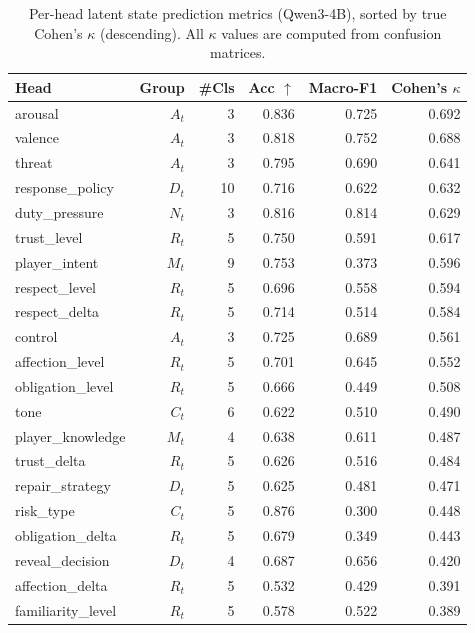 \documentclass[11pt]{article}
\begin{document}
\begin{table}[tp]
\centering
\caption{Per-head latent state prediction metrics (Qwen3-4B), sorted by true Cohen's $\kappa$ (descending). All $\kappa$ values are computed from confusion matrices.}
\label{tab:perhead}
\scriptsize\setlength{\tabcolsep}{1.5pt}
\begin{tabular}{@{}lrrrrr@{}}
\toprule
\textbf{Head} & \textbf{Group} & \textbf{\#Cls} & \textbf{Acc $\uparrow$} & \textbf{Macro-F1} & \textbf{Cohen's $\kappa$} \\
\midrule
arousal           & $A_t$ & 3  & 0.836 & 0.725 & 0.692 \\
valence           & $A_t$ & 3  & 0.818 & 0.752 & 0.688 \\
threat            & $A_t$ & 3  & 0.795 & 0.690 & 0.641 \\
response\_policy  & $D_t$ & 10 & 0.716 & 0.622 & 0.632 \\
duty\_pressure    & $N_t$ & 3  & 0.816 & 0.814 & 0.629 \\
trust\_level      & $R_t$ & 5  & 0.750 & 0.591 & 0.617 \\
player\_intent    & $M_t$ & 9  & 0.753 & 0.373 & 0.596 \\
respect\_level    & $R_t$ & 5  & 0.696 & 0.558 & 0.594 \\
respect\_delta    & $R_t$ & 5  & 0.714 & 0.514 & 0.584 \\
control           & $A_t$ & 3  & 0.725 & 0.689 & 0.561 \\
affection\_level  & $R_t$ & 5  & 0.701 & 0.645 & 0.552 \\
obligation\_level & $R_t$ & 5  & 0.666 & 0.449 & 0.508 \\
tone              & $C_t$ & 6  & 0.622 & 0.510 & 0.490 \\
player\_knowledge & $M_t$ & 4  & 0.638 & 0.611 & 0.487 \\
trust\_delta      & $R_t$ & 5  & 0.626 & 0.516 & 0.484 \\
repair\_strategy  & $D_t$ & 5  & 0.625 & 0.481 & 0.471 \\
risk\_type        & $C_t$ & 5  & 0.876 & 0.300 & 0.448 \\
obligation\_delta & $R_t$ & 5  & 0.679 & 0.349 & 0.443 \\
reveal\_decision  & $D_t$ & 4  & 0.687 & 0.656 & 0.420 \\
affection\_delta  & $R_t$ & 5  & 0.532 & 0.429 & 0.391 \\
familiarity\_level& $R_t$ & 5  & 0.578 & 0.522 & 0.389 \\

\end{tabular}
\end{table}
\end{document}
